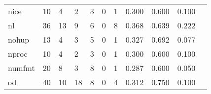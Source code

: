 \begin{longtable}{lp{1.20cm}p{1.20cm}p{1.20cm}p{1.20cm}p{1.20cm}p{1.20cm}p{1.20cm}p{1.20cm}p{1.20cm}p{1.20cm}}
nice      &                                    10 &                                                  4 &                                                  2 &                                                  3 &                                                  0 &                                                  1 &                                         0.300 &                                              0.600 &                                              0.100 \\
nl        &                                    36 &                                                 13 &                                                  9 &                                                  6 &                                                  0 &                                                  8 &                                         0.368 &                                              0.639 &                                              0.222 \\
nohup     &                                    13 &                                                  4 &                                                  3 &                                                  5 &                                                  0 &                                                  1 &                                         0.327 &                                              0.692 &                                              0.077 \\
nproc     &                                    10 &                                                  4 &                                                  2 &                                                  3 &                                                  0 &                                                  1 &                                         0.300 &                                              0.600 &                                              0.100 \\
numfmt    &                                    20 &                                                  8 &                                                  3 &                                                  8 &                                                  0 &                                                  1 &                                         0.287 &                                              0.600 &                                              0.050 \\
od        &                                    40 &                                                 10 &                                                 18 &                                                  8 &                                                  0 &                                                  4 &                                         0.312 &                                              0.750 &                                              0.100 \\

\end{longtable}
